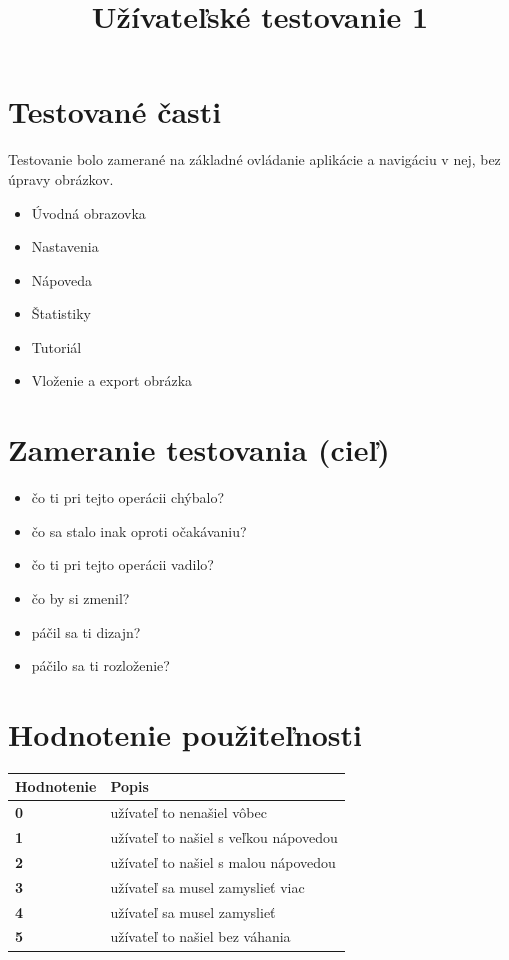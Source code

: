 \documentclass[a4paper,12pt]{article}
\title{Užívateľské testovanie 1}
\date{}
\begin{document}
\maketitle

\section*{Testované časti}
Testovanie bolo zamerané na základné ovládanie aplikácie a navigáciu v nej, bez úpravy obrázkov.
\begin{itemize}
    \item Úvodná obrazovka
    \item Nastavenia
    \item Nápoveda
    \item Štatistiky
    \item Tutoriál
    \item Vloženie a export obrázka
\end{itemize}

\section*{Zameranie testovania (cieľ)}
\begin{itemize}
    \item čo ti pri tejto operácii chýbalo?
    \item čo sa stalo inak oproti očakávaniu?
    \item čo ti pri tejto operácii vadilo?
    \item čo by si zmenil?
    \item páčil sa ti dizajn?
    \item páčilo sa ti rozloženie?
\end{itemize}

\newpage
\section*{Hodnotenie použiteľnosti}
\begin{longtable}{>{\bfseries}l l}
\toprule
Hodnotenie & Popis \\
\midrule
0 & užívateľ to nenašiel vôbec \\
1 & užívateľ to našiel s veľkou nápovedou \\
2 & užívateľ to našiel s malou nápovedou \\
3 & užívateľ sa musel zamyslieť viac \\
4 & užívateľ sa musel zamyslieť \\
5 & užívateľ to našiel bez váhania \\
\bottomrule
\end{longtable}
\end{document}
